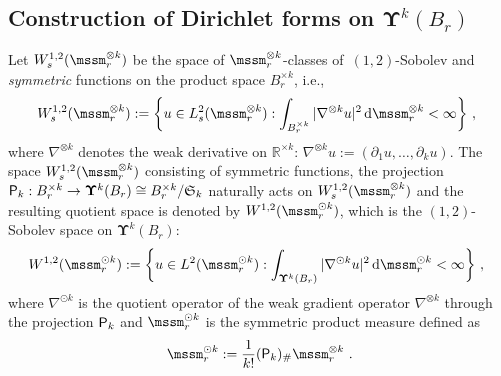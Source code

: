 \documentclass[11pt,letterpaper]{amsart}
\newcommand{\diff}{\mathop{}\!\mathrm{d}}
\newcommand{\R}{{\mathbb R}}
\newcommand{\comma}{\,\,\mathrm{,}\;\,}
\newcommand{\fstop}{\,\,\mathrm{.}}
\newcommand{\dUpsilon}{{\mathbf \Upsilon}}
\newcommand{\U}{\dUpsilon}
\renewcommand{\1}{\mathbf 1}
\newcommand{\lab}{\mathfrak l}
\numberwithin{equation}{section}
\theoremstyle{plain}
\theoremstyle{definition}
\theoremstyle{remark}
\newcommand{\quot}{{\sf P}}
\begin{document}
\subsection{Construction of Dirichlet forms on $\U^k(B_r)$}
Let $W^{1,2}_s(\mssm^{\otimes k}_r)$ be the space of $\mssm^{\otimes k}_r$-classes of~$(1,2)$-Sobolev and {\it symmetric} functions on the product space $B_r^{\times k}$, i.e., 
$$W^{1,2}_s(\mssm^{\otimes k}_r):=\biggl\{u \in L^2_s(\mssm^{\otimes k}_{r}): \int_{B_r^{\times k}} |\nabla^{\otimes k} u|^2 \diff \mssm^{\otimes k}_{r} <\infty \biggr\} \comma$$
where $\nabla^{\otimes k}$ denotes the weak derivative on $\R^{\times k}$: $\nabla^{\otimes k}u:=(\partial_1 u, \ldots, \partial_ku)$.   
The space $W^{1,2}_s(\mssm^{\otimes k}_r)$ consisting of symmetric functions, the projection $\quot_k: B_r^{\times k} \to \U^k(B_r) \cong B_r^{\times k} /\mathfrak S_k$ naturally acts on $W^{1,2}_s(\mssm^{\otimes k}_r)$ and the resulting quotient space is denoted by $W^{1,2}(\mssm_r^{\odot k})$, which is the $(1,2)$-Sobolev space on $\U^k(B_r)$:
$$W^{1,2}(\mssm^{\odot k}_r):=\biggl\{u \in L^2(\mssm^{\odot k}_{r}): \int_{\U^k(B_r)} |\nabla^{\odot k} u|^2 \diff \mssm^{\odot k}_{r} <\infty \biggr\} \comma$$
where $\nabla^{\odot k}$ is the quotient operator of the weak gradient operator $\nabla^{\otimes k}$ through the projection $\quot_k$ and $\mssm_r^{\odot k}$ is the symmetric product measure defined as 
$$\mssm_r^{\odot k}:=\frac{1}{k!} (\quot_k)_\#\mssm_r^{\otimes k} \fstop$$
\end{document}
